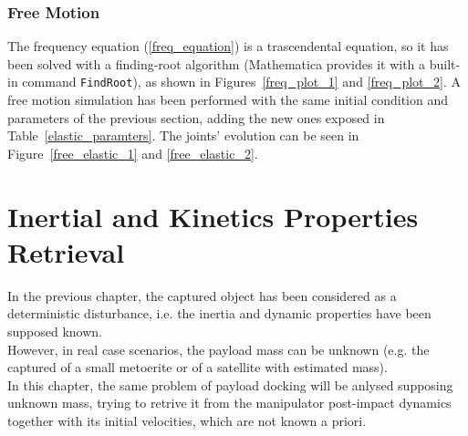 \documentclass[a4paper,12pt,oneside]{report}
\begin{document}
\subsection{Free Motion}
The frequency equation (\ref{freq_equation}) is a trascendental equation, so it has been solved with a finding-root algorithm (Mathematica provides it with a built-in command \texttt{FindRoot}), as shown in Figures~\ref{freq_plot_1} and \ref{freq_plot_2}.
A free motion simulation has been performed with the same initial condition and parameters of the previous section, adding the new ones exposed in Table~\ref{elastic_paramters}. The joints' evolution can be seen in Figure~\ref{free_elastic_1} and \ref{free_elastic_2}.
\chapter{Inertial and Kinetics Properties Retrieval}
In the previous chapter, the captured object has been considered as a deterministic disturbance, i.e. the inertia and dynamic properties have been supposed known.\\
However, in real case scenarios, the payload mass can be unknown (e.g. the captured of a small metoerite or of a satellite with estimated mass).\\
In this chapter, the same problem of payload docking will be anlysed supposing unknown mass, trying to retrive it from the manipulator post-impact dynamics together with its initial velocities, which are not known a priori.
\newpage
\end{document}
